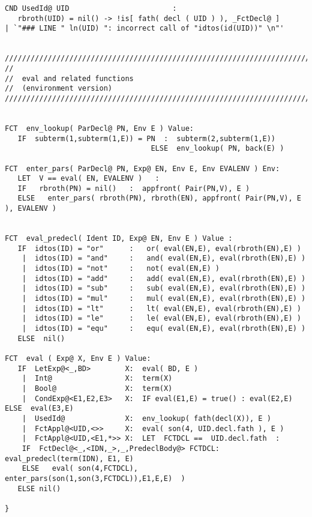 \begin{verbatim}
CND UsedId@ UID                        :
   rbroth(UID) = nil() -> !is[ fath( decl ( UID ) ), _FctDecl@ ]
| `"### LINE " ln(UID) ": incorrect call of "idtos(id(UID))" \n"'


///////////////////////////////////////////////////////////////////////////
//
//  eval and related functions
//  (environment version)
///////////////////////////////////////////////////////////////////////////
                         

FCT  env_lookup( ParDecl@ PN, Env E ) Value:
   IF  subterm(1,subterm(1,E)) = PN  :  subterm(2,subterm(1,E))
                                  ELSE  env_lookup( PN, back(E) )

FCT  enter_pars( ParDecl@ PN, Exp@ EN, Env E, Env EVALENV ) Env:
   LET  V == eval( EN, EVALENV )   :
   IF   rbroth(PN) = nil()   :	appfront( Pair(PN,V), E )
   ELSE   enter_pars( rbroth(PN), rbroth(EN), appfront( Pair(PN,V), E ), EVALENV )


FCT  eval_predecl( Ident ID, Exp@ EN, Env E ) Value :
   IF  idtos(ID) = "or"      :   or( eval(EN,E), eval(rbroth(EN),E) )
    |  idtos(ID) = "and"     :   and( eval(EN,E), eval(rbroth(EN),E) )
    |  idtos(ID) = "not"     :   not( eval(EN,E) )
    |  idtos(ID) = "add"     :   add( eval(EN,E), eval(rbroth(EN),E) )
    |  idtos(ID) = "sub"     :   sub( eval(EN,E), eval(rbroth(EN),E) )
    |  idtos(ID) = "mul"     :   mul( eval(EN,E), eval(rbroth(EN),E) )
    |  idtos(ID) = "lt"      :   lt( eval(EN,E), eval(rbroth(EN),E) )
    |  idtos(ID) = "le"      :   le( eval(EN,E), eval(rbroth(EN),E) )
    |  idtos(ID) = "equ"     :   equ( eval(EN,E), eval(rbroth(EN),E) )
   ELSE  nil()

FCT  eval ( Exp@ X, Env E ) Value:
   IF  LetExp@<_,BD>        X:  eval( BD, E )
    |  Int@                 X:  term(X)
    |  Bool@                X:  term(X)
    |  CondExp@<E1,E2,E3>   X:  IF eval(E1,E) = true() : eval(E2,E)  ELSE  eval(E3,E) 
    |  UsedId@              X:  env_lookup( fath(decl(X)), E )
    |  FctAppl@<UID,<>>     X:  eval( son(4, UID.decl.fath ), E )
    |  FctAppl@<UID,<E1,*>> X:  LET  FCTDCL ==  UID.decl.fath  :
	IF  FctDecl@<_,<IDN,_>,_,PredeclBody@> FCTDCL:  eval_predecl(term(IDN), E1, E)
	ELSE   eval( son(4,FCTDCL), enter_pars(son(1,son(3,FCTDCL)),E1,E,E)  )
   ELSE nil()

}
\end{verbatim}

